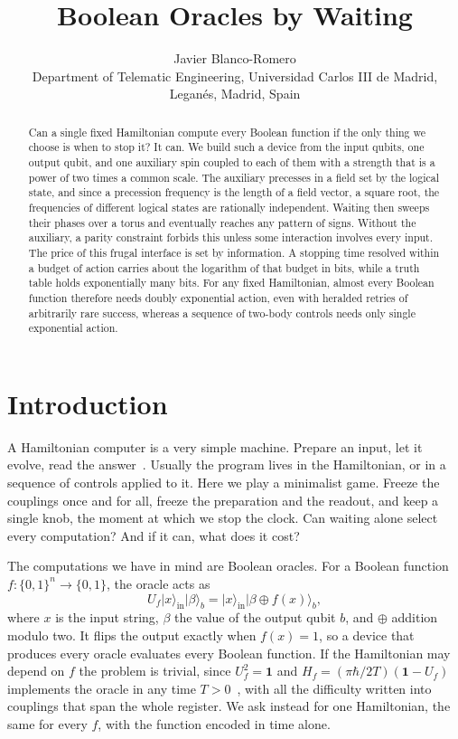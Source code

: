 \documentclass[11pt,a4paper]{article}
\title{Boolean Oracles by Waiting}
\author{Javier Blanco-Romero\\\small Department of Telematic Engineering, Universidad Carlos III de Madrid,\\Legan\'es, Madrid, Spain}
\date{}
\providecommand{\openone}{\mathbf{1}}
\newcommand{\ket}[1]{\lvert #1\rangle}
\newcommand{\id}{\openone}
\begin{document}
\maketitle
\begin{abstract}
Can a single fixed Hamiltonian compute every Boolean function if the only thing we choose is when to stop it? It can. We build such a device from the input qubits, one output qubit, and one auxiliary spin coupled to each of them with a strength that is a power of two times a common scale. The auxiliary precesses in a field set by the logical state, and since a precession frequency is the length of a field vector, a square root, the frequencies of different logical states are rationally independent. Waiting then sweeps their phases over a torus and eventually reaches any pattern of signs. Without the auxiliary, a parity constraint forbids this unless some interaction involves every input. The price of this frugal interface is set by information. A stopping time resolved within a budget of action carries about the logarithm of that budget in bits, while a truth table holds exponentially many bits. For any fixed Hamiltonian, almost every Boolean function therefore needs doubly exponential action, even with heralded retries of arbitrarily rare success, whereas a sequence of two-body controls needs only single exponential action.
\end{abstract}

\section{Introduction}
\label{sec:intro}

A Hamiltonian computer is a very simple machine. Prepare an input, let it evolve, read the answer~\cite{Feynman1986}. Usually the program lives in the Hamiltonian, or in a sequence of controls applied to it. Here we play a minimalist game. Freeze the couplings once and for all, freeze the preparation and the readout, and keep a single knob, the moment at which we stop the clock. Can waiting alone select every computation? And if it can, what does it cost?

The computations we have in mind are Boolean oracles. For a Boolean function $f:\{0,1\}^n\to\{0,1\}$, the oracle acts as
\begin{equation}
 U_f\ket{x}_{\mathrm{in}}\ket{\beta}_b
 =\ket{x}_{\mathrm{in}}\ket{\beta\oplus f(x)}_b,
 \label{eq:oracle}
\end{equation}
where $x$ is the input string, $\beta$ the value of the output qubit $b$, and $\oplus$ addition modulo two. It flips the output exactly when $f(x)=1$, so a device that produces every oracle evaluates every Boolean function. If the Hamiltonian may depend on $f$ the problem is trivial, since $U_f^2=\id$ and $H_f=(\pi\hbar/2T)(\id-U_f)$ implements the oracle in any time $T>0$~\cite{Hadfield2021}, with all the difficulty written into couplings that span the whole register. We ask instead for one Hamiltonian, the same for every $f$, with the function encoded in time alone.
\end{document}
